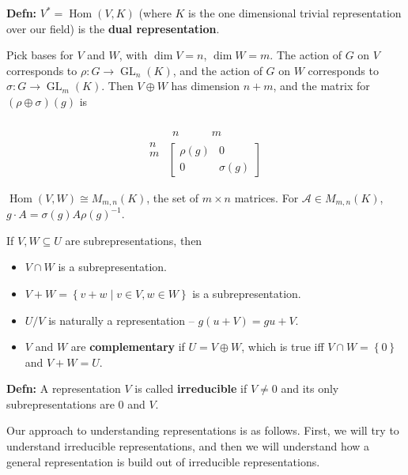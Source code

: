 \documentclass[10pt,letterpaper]{article}
\newcommand{\n}{\hfill\break}
\newcommand{\up}{\vspace{-\baselineskip}}
\newcommand{\hangblock}[2]{\par\noindent\settowidth{\hangindent}{\textbf{#1: }}\textbf{#1: }\!\!\!#2}
\newcommand{\defn}[1]{\hangblock{Defn}{#1}}
\newcommand{\set}[1]{\left\{#1\right\}}
\DeclareMathOperator{\Hom}{Hom}
\newcommand{\inv}{^{-1}}
\DeclareMathOperator{\GL}{GL}
\begin{document}
\defn{
	$V^{*}=\Hom(V,K)$ (where $K$ is the one dimensional trivial representation over our field) is the \textbf{dual representation}.\n
}

\par\noindent
Pick bases for $V$ and $W$, with $\dim{}V=n$, $\dim{}W=m$. The action of $G$ on $V$ corresponds to $\rho:G\to\GL_{n}(K)$, and the action of $G$ on $W$ corresponds to $\sigma:G\to\GL_{m}(K)$. Then $V\oplus{}W$ has dimension $n+m$, and the matrix for $(\rho\oplus\sigma)(g)$ is
\up\[
	\begin{array}{c}
		\\
		\\
		n\\
		m
	\end{array}
	\begin{array}{c}
		\begin{array}{cc}
			\phantom{\rho(g)} & \phantom{\sigma(g)}\\
			n & m
		\end{array}\\
		\left[
		\begin{array}{c|c}
			\rho(g) & 0\\ \hline
			0 & \sigma(g)
		\end{array}
		\right]
	\end{array}
\]

\par\noindent
$\Hom(V,W)\cong{}M_{m,n}(K)$, the set of $m\times{}n$ matrices. For $\mathcal{A}\in{}M_{m,n}(K)$, $g\cdot{}A=\sigma(g)A\rho(g)\inv$.\n

\par\noindent
If $V,W\subseteq{}U$ are subrepresentations, then
\begin{itemize}
	\item $V\cap{}W$ is a subrepresentation.
	\item $V+W=\set{v+w\mid{}v\in{}V,w\in{}W}$ is a subrepresentation.
	\item $U/V$ is naturally a representation -- $g(u+V)=gu+V$.
	\item $V$ and $W$ are \textbf{complementary} if $U=V\oplus{}W$, which is true iff $V\cap{}W=\set{0}$ and $V+W=U$.
\end{itemize}

\defn{
	A representation $V$ is called \textbf{irreducible} if $V\ne{}0$ and its only subrepresentations are $0$ and $V$.\n
}

\par\noindent
Our approach to understanding representations is as follows. First, we will try to understand irreducible representations, and then we will understand how a general representation is build out of irreducible representations.\n
\end{document}
